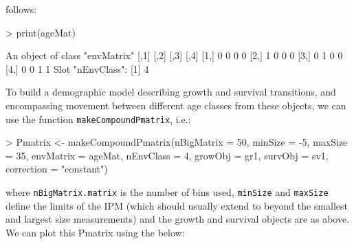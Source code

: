 \documentclass{article}
\begin{document}
follows:
\begin{Schunk}
\begin{Sinput}
> print(ageMat)
\end{Sinput}
\begin{Soutput}
An object of class "envMatrix"
     [,1] [,2] [,3] [,4]
[1,]    0    0    0    0
[2,]    1    0    0    0
[3,]    0    1    0    0
[4,]    0    0    1    1
Slot "nEnvClass":
[1] 4
\end{Soutput}
\end{Schunk}
To build a demographic model describing growth and survival transitions, and
encompassing movement between different age classes from these objects, we
can use the function {\tt makeCompoundPmatrix}, i.e.:
\begin{Schunk}
\begin{Sinput}
> Pmatrix <- makeCompoundPmatrix(nBigMatrix = 50, minSize = -5,
                                 maxSize = 35,
                                 envMatrix = ageMat,
  							   nEnvClass = 4,
                                 growObj = gr1,
                                 survObj = sv1,
                                 correction = "constant")
\end{Sinput}
\end{Schunk}
where {\tt nBigMatrix.matrix} is the number of bins used, {\tt minSize} and {\tt maxSize} define the limits of
the IPM (which should usually extend to beyond the smallest and largest size measurements) and the growth and survival objects are as above.  We can
plot this Pmatrix using the below:
\end{document}
